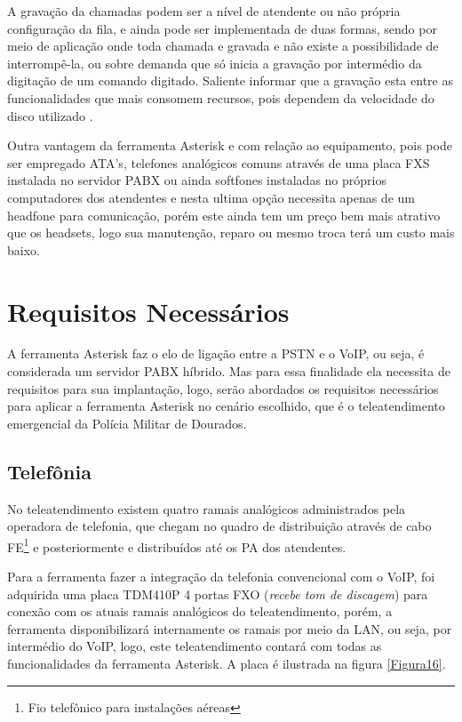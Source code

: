 A gravação da chamadas podem ser a nível de atendente ou não própria configuração da fila, e ainda pode ser implementada de duas formas, sendo por meio de aplicação onde toda chamada e gravada e não existe a possibilidade de interrompê-la, ou sobre demanda que só inicia a gravação por intermédio da digitação de um comando digitado. Saliente informar que a gravação esta entre as funcionalidades que mais consomem recursos, pois dependem da velocidade do disco utilizado \cite{alexandrekeller2014}.

Outra vantagem da ferramenta Asterisk e com relação ao equipamento, pois pode ser empregado ATA's, telefones analógicos comuns através de uma placa FXS instalada no servidor PABX ou ainda softfones instaladas no próprios computadores dos atendentes e nesta ultima opção necessita apenas de um headfone para comunicação, porém este ainda tem um preço bem mais atrativo que os headsets, logo sua manutenção, reparo ou mesmo troca terá um custo mais baixo.

\section{Requisitos Necessários}
A ferramenta Asterisk faz o elo de ligação entre a PSTN e o VoIP, ou seja, é considerada um servidor PABX híbrido. Mas para essa finalidade ela necessita de requisitos para sua implantação, logo, serão abordados os requisitos necessários para aplicar a ferramenta Asterisk no cenário escolhido, que é o teleatendimento emergencial da Polícia Militar de Dourados.

\subsection{Telefônia}
No teleatendimento existem quatro ramais analógicos administrados pela operadora de telefonia, que chegam no quadro de distribuição através de cabo FE\footnote{Fio telefônico para instalações aéreas} e posteriormente e distribuídos até os PA dos atendentes.

Para a ferramenta fazer a integração da telefonia convencional com o VoIP, foi adquirida uma placa TDM410P 4 portas FXO (\textit{recebe tom de discagem}) para conexão com os atuais ramais analógicos do teleatendimento, porém, a ferramenta disponibilizará internamente os ramais por meio da LAN, ou seja, por intermédio do VoIP, logo, este teleatendimento contará com todas as funcionalidades da ferramenta Asterisk. A placa é ilustrada na figura \ref{Figura16}.

